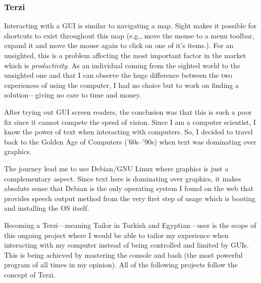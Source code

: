 \subsubsection{
Terzi
}
Interacting with a GUI is similar to navigating a map.
Sight makes it possible for shortcuts to exist throughout this map (e.g., move 
the mouse to a menu toolbar, expand it and move the mouse again to click on 
one of it's items.).
For an unsighted, this is a problem affecting the most important factor in the 
market which is \emph{productivity}.
As an individual coming from the sighted world to the unsighted one and that I 
can observe the huge difference between the two experiences of using the 
computer, I had no choice but to work on finding a solution---giving no care to 
time and money.

After trying out GUI screen readers, the conclusion was that this is such a poor 
fix since it cannot compete the speed of vision.
Since I am a computer scientist, I know the power of text when interacting with 
computers.
So, I decided to travel back to the Golden Age of Computers ('60s--'90s) when 
text was dominating over graphics.

The journey lead me to use Debian/GNU Linux where graphics is just a 
complementary aspect.
Since text here is dominating over graphics, it makes absolute sense that Debian 
is the only operating system I found on the web that provides speech output 
method from the very first step of usage which is booting and installing the OS 
itself.

Becoming a Terzi---meaning Tailor in Turkish and Egyptian---user is the scope of 
this ongoing project where I would be able to tailor my experience when 
interacting with my computer instead of being controlled and limited by GUIs.
This is being achieved by mastering the console and bash (the most powerful 
program of all times in my opinion).
All of the following projects follow the concept of Terzi.

